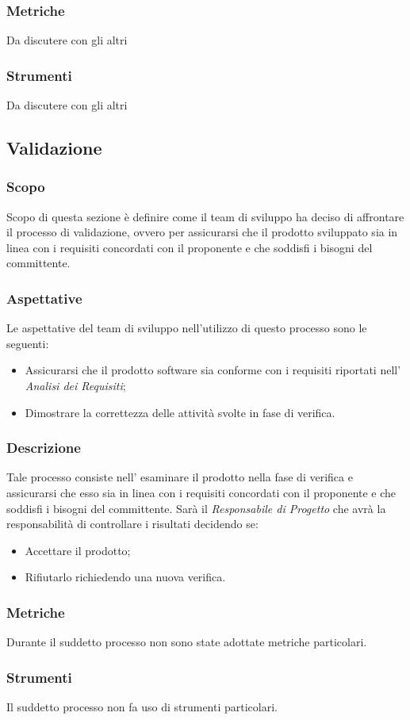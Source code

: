     \subsubsection{Metriche}
    Da discutere con gli altri

    \subsubsection{Strumenti}
    Da discutere con gli altri
    

\pagebreak

\subsection{Validazione}\label{subsection: validazione}
\subsubsection{Scopo}
Scopo di questa sezione è definire come il team di sviluppo ha deciso di affrontare il processo di validazione, ovvero per assicurarsi che il prodotto sviluppato sia in linea con i requisiti concordati con il proponente e che soddisfi i bisogni del committente.
\subsubsection{Aspettative}
Le aspettative del team di sviluppo nell'utilizzo di questo processo sono le seguenti: 
\begin{itemize}
    \item Assicurarsi che il prodotto software sia conforme con i requisiti riportati nell' \textit{Analisi dei Requisiti};
    \item  Dimostrare la correttezza delle attività svolte in fase di verifica.
\end{itemize}
\subsubsection{Descrizione}
Tale processo consiste nell' esaminare il prodotto nella fase di verifica e assicurarsi che esso sia in linea con i requisiti concordati con il proponente e che soddisfi i bisogni del committente.
Sarà il \textit{Responsabile di Progetto} che avrà la responsabilità di controllare i risultati decidendo se:
\begin{itemize}
    \item Accettare il prodotto;
    \item Rifiutarlo richiedendo una nuova verifica.
\end{itemize}    
\subsubsection{Metriche}
Durante il suddetto processo non sono state adottate metriche particolari.
\subsubsection{Strumenti}
Il suddetto processo non fa uso di strumenti particolari.


